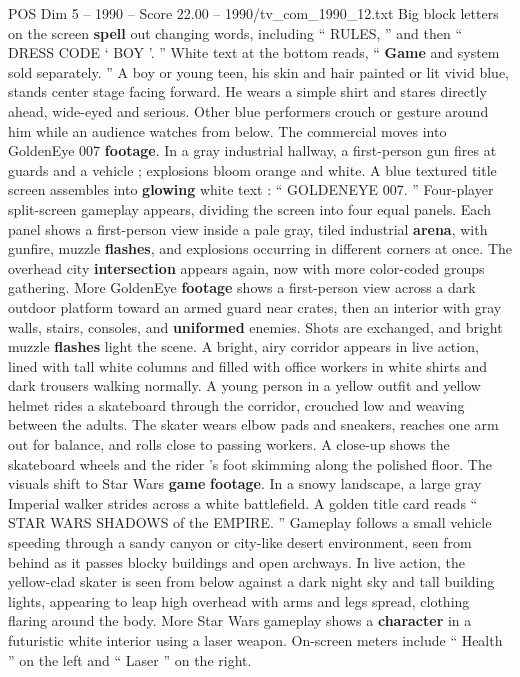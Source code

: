 \begin{textsample}{POS Dim 5 – 1990 – Score 22.00 – 1990/tv\_com\_1990\_12.txt}
Big block letters on the screen \textbf{spell} out changing words, including “ RULES, ” and then “ DRESS CODE ‘ BOY ’. ” White text at the bottom reads, “ \textbf{Game} and system sold separately. ” A boy or young teen, his skin and hair painted or lit vivid blue, stands center stage facing forward.
He wears a simple shirt and stares directly ahead, wide-eyed and serious.
Other blue performers crouch or gesture around him while an audience watches from below.
The commercial moves into GoldenEye 007 \textbf{footage}.
In a gray industrial hallway, a first-person gun fires at guards and a vehicle ; explosions bloom orange and white.
A blue textured title screen assembles into \textbf{glowing} white text : “ GOLDENEYE 007. ” Four-player split-screen gameplay appears, dividing the screen into four equal panels.
Each panel shows a first-person view inside a pale gray, tiled industrial \textbf{arena}, with gunfire, muzzle \textbf{flashes}, and explosions occurring in different corners at once.
The overhead city \textbf{intersection} appears again, now with more color-coded groups gathering.
More GoldenEye \textbf{footage} shows a first-person view across a dark outdoor platform toward an armed guard near crates, then an interior with gray walls, stairs, consoles, and \textbf{uniformed} enemies.
Shots are exchanged, and bright muzzle \textbf{flashes} light the scene.
A bright, airy corridor appears in live action, lined with tall white columns and filled with office workers in white shirts and dark trousers walking normally.
A young person in a yellow outfit and yellow helmet rides a skateboard through the corridor, crouched low and weaving between the adults.
The skater wears elbow pads and sneakers, reaches one arm out for balance, and rolls close to passing workers.
A close-up shows the skateboard wheels and the rider ’s foot skimming along the polished floor.
The visuals shift to Star Wars \textbf{game} \textbf{footage}.
In a snowy landscape, a large gray Imperial walker strides across a white battlefield.
A golden title card reads “ STAR WARS SHADOWS of the EMPIRE. ” Gameplay follows a small vehicle speeding through a sandy canyon or city-like desert environment, seen from behind as it passes blocky buildings and open archways.
In live action, the yellow-clad skater is seen from below against a dark night sky and tall building lights, appearing to leap high overhead with arms and legs spread, clothing flaring around the body.
More Star Wars gameplay shows a \textbf{character} in a futuristic white interior using a laser weapon.
On-screen meters include “ Health ” on the left and “ Laser ” on the right.

\end{textsample}
